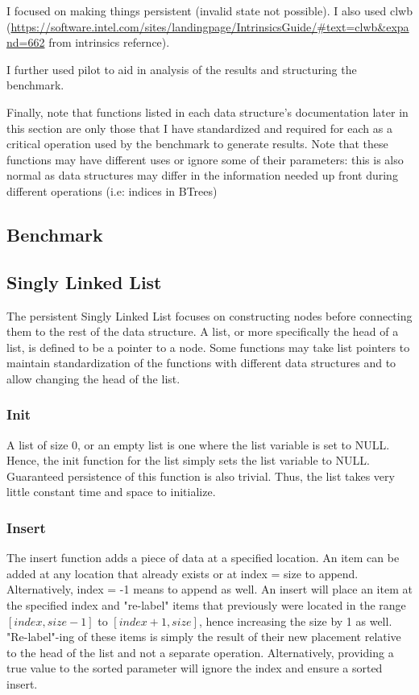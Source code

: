 \documentclass[twocolumn]{article}
\begin{document}
I focused on making things persistent (invalid state not possible). I also
used clwb
(\url{https://software.intel.com/sites/landingpage/IntrinsicsGuide/#text=clwb&expand=662}
from intrinsics refernce).

I further used pilot to aid in analysis of the results and structuring the
benchmark.

Finally, note that functions listed in each data structure's documentation later
in this section are only those that I have standardized and required for each as
a critical operation used by the benchmark to generate results. Note that these
functions may have different uses or ignore some of their parameters: this is
also normal as data structures may differ in the information needed up front
during different operations (i.e: indices in BTrees)

\subsection{Benchmark}

\subsection{Singly Linked List}

The persistent Singly Linked List focuses on constructing nodes before
connecting them to the rest of the data structure. A list, or more specifically
the head of a list, is defined to be a pointer to a node. Some functions may
take list pointers to maintain standardization of the functions with different
data structures and to allow changing the head of the list.

\subsubsection{Init}

A list of size 0, or an empty list is one where the list variable is set to
NULL. Hence, the init function for the list simply sets the list variable to
NULL. Guaranteed persistence of this function is also trivial. Thus, the list
takes very little constant time and space to initialize.

\subsubsection{Insert}

The insert function adds a piece of data at a specified location. An item can be
added at any location that already exists or at index = size to append.
Alternatively, index = -1 means to append as well. An insert will place an item
at the specified index and "re-label" items that previously were located in the
range $[index,size-1]$ to $[index+1,size]$, hence increasing the size by 1 as
well. "Re-label"-ing of these items is simply the result of their new placement
relative to the head of the list and not a separate operation. Alternatively,
providing a true value to the sorted parameter will ignore the index and ensure
a sorted insert.
\end{document}
